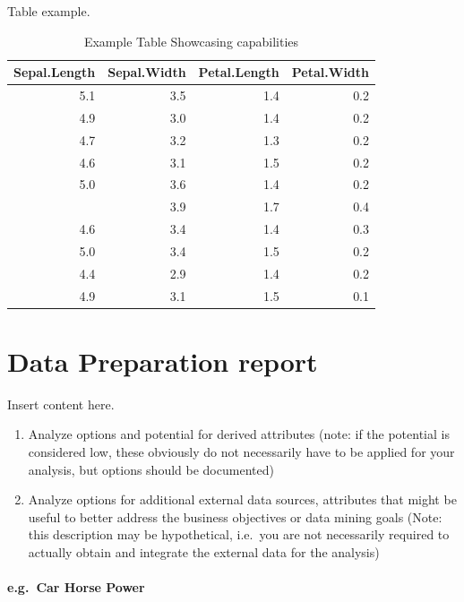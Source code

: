 \documentclass[sigchi]{acmart}
\def\tightlist{}
\begin{document}
Table example.

\begin{table}

\caption{\label{tab:table-iris}Example Table Showcasing capabilities}
\centering
\begin{tabular}[t]{rrrr}
\toprule
Sepal.Length & Sepal.Width & Petal.Length & Petal.Width\\
\midrule
5.1 & 3.5 & 1.4 & 0.2\\
4.9 & 3.0 & 1.4 & 0.2\\
4.7 & 3.2 & 1.3 & 0.2\\
4.6 & 3.1 & 1.5 & 0.2\\
5.0 & 3.6 & 1.4 & 0.2\\
\addlinespace
5.4 & 3.9 & 1.7 & 0.4\\
4.6 & 3.4 & 1.4 & 0.3\\
5.0 & 3.4 & 1.5 & 0.2\\
4.4 & 2.9 & 1.4 & 0.2\\
4.9 & 3.1 & 1.5 & 0.1\\
\bottomrule
\end{tabular}
\end{table}

\hypertarget{data-preparation-report}{%
\section{Data Preparation report}\label{data-preparation-report}}

Insert content here.

\begin{enumerate}
\def\labelenumi{\alph{enumi}.}
\tightlist
\item
  Analyze options and potential for derived attributes (note: if the potential is considered low, these obviously do not necessarily have to be applied for your analysis, but options should be documented)
\item
  Analyze options for additional external data sources, attributes that might be useful to better address the business objectives or data mining goals (Note: this description may be hypothetical, i.e.~you are not necessarily required to actually obtain and integrate the external data for the analysis)
\end{enumerate}

\hypertarget{e.g.-car-horse-power}{%
\paragraph{e.g.~Car Horse Power}\label{e.g.-car-horse-power}}
\end{document}
